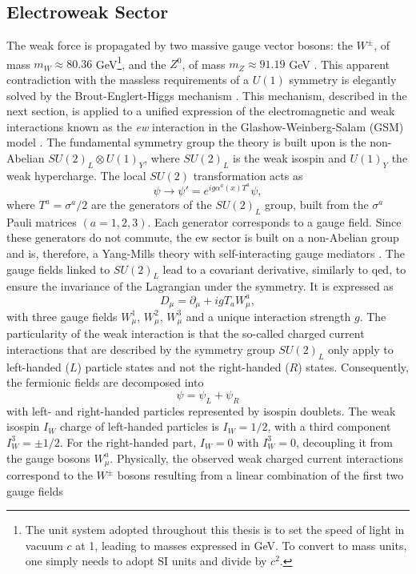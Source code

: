 \subsection{Electroweak Sector}
The weak force is propagated by two massive gauge vector bosons: the $W^{\pm}$, of mass $m_W \approx 80.36$ GeV\footnote{The unit system adopted throughout this thesis is to set the speed of light in vacuum $c$ at 1, leading to masses expressed in GeV. To convert to mass units, one simply needs to adopt SI units and divide by $c^2$.}, and the $Z^0$, of mass $m_Z \approx 91.19$ GeV \cite{Tanabashi:2018oca}. This apparent contradiction with the massless requirements of a $U(1)$ symmetry is elegantly solved by the Brout-Englert-Higgs mechanism \cite{Englert:1964et, PhysRevLett.13.508}. This mechanism, described in the next section, is applied to a unified expression of the electromagnetic and weak interactions known as the \textit{\gls{ew}} interaction in the Glashow-Weinberg-Salam (GSM) model \cite{GLASHOW1961579, PhysRevLett.19.1264, Salam:1968rm}. The fundamental symmetry group the theory is built upon is the non-Abelian $SU(2)_L \otimes U(1)_Y$, where $SU(2)_L$ is the weak isospin and $U(1)_Y$ the weak hypercharge. The local $SU(2)$ transformation acts as
\begin{equation}\label{eq-GaugeSU2}
    \psi \rightarrow \psi' = e^{i g \alpha^a(x) T^a } \psi,
\end{equation}
where $T^a = \sigma^a / 2$ are the generators of the $SU(2)_L$ group, built from the $\sigma^a$ Pauli matrices $(a = 1, 2, 3)$. Each generator corresponds to a gauge field. Since these generators do not commute, the \gls{ew} sector is built on a non-Abelian group and is, therefore, a Yang-Mills theory with self-interacting gauge mediators \cite{PhysRev.96.191}. The gauge fields linked to $SU(2)_L$ lead to a covariant derivative, similarly to \gls{qed}, to ensure the invariance of the Lagrangian under the symmetry. It is expressed as
\begin{equation}\label{eq-CovDerSU2}
   D_{\mu}  = \partial_{\mu} + igT_a W_{\mu}^a,
\end{equation}
with three gauge fields $W_{\mu}^1$, $W_{\mu}^2$, $W_{\mu}^3$ and a unique interaction strength $g$. The particularity of the weak interaction is that the so-called charged current interactions that are described by the symmetry group $SU(2)_L$ only apply to left-handed ($L$) particle states and not the right-handed ($R$) states. Consequently, the fermionic fields are decomposed into \[\psi = \psi_L + \psi_R\] with left- and right-handed particles represented by isospin doublets. The weak isospin $I_W$ charge of left-handed particles is $I_W = 1/2$, with a third component $I_W^3 = \pm  1/2$. For the right-handed part, $I_W = 0$ with $I_W^3 = 0$, decoupling it from the gauge bosons $W_{\mu}^a$. Physically, the observed weak charged current interactions correspond to the $W^{\pm}$ bosons resulting from a linear combination of the first two gauge fields
